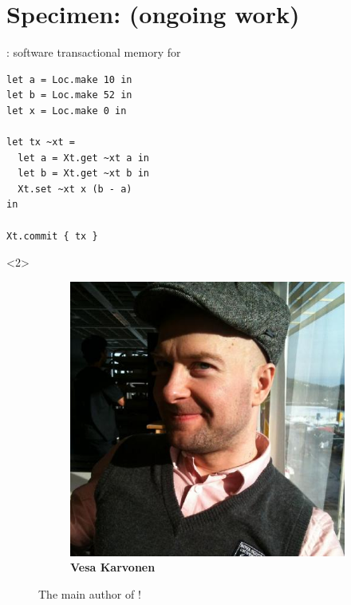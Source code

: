 \newcommand{\kcas}{%
  \kappa%
}

\newcommand{\similar}{%
  \approx%
}
\newcommand{\nonsimilar}{%
  \not\approx
}

\newcommand{\view}{%
  \mathcal{V}%
}
\newcommand{\viewTwo}{%
  \mathcal{W}%
}
\newcommand{\viewJoin}[2]{%
  #1 \sqcup #2%
}

\newcommand{\iKcasPointsto}{%
  \rightarrowtail%
}
\newcommand{\iView}[1]{%
  \sqsupseteq #1%
}

\newcommand{\colorLoc}{blue}
\newcommand{\colorBefore}{red}
\newcommand{\colorAfter}{Green}
\newcommand{\colorReadOnly}{cyan}
\newcommand{\colorResult}{orange}
\newcommand{\colorView}{brown}


\section{Specimen: \Kcas (ongoing work)}

\begin{frame}[fragile]{\Kcas: software transactional memory for \OCaml}
\Large
\begin{verbatim}
let a = Loc.make 10 in
let b = Loc.make 52 in
let x = Loc.make 0 in

let tx ~xt =
  let a = Xt.get ~xt a in
  let b = Xt.get ~xt b in
  Xt.set ~xt x (b - a)
in

Xt.commit { tx }
\end{verbatim}
\begin{overbox}<2>
  \begin{figure}
    \begin{subfigure}{0.4\textwidth}
      \centering
      \includegraphics[scale=0.2]{images/vesa_karvonen.jpg}
      \caption*{\footnotesize \textbf{Vesa Karvonen}}
    \end{subfigure}
    \caption*{The main author of \Kcas!}
  \end{figure}
\end{overbox}
\end{frame}

